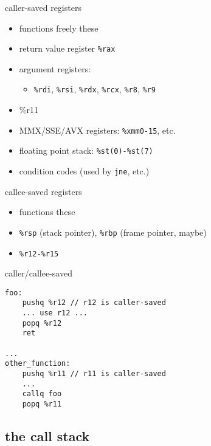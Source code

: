 \begin{frame}{caller-saved registers}
    \begin{itemize}
        \item functions  freely  these
        \vspace{.5cm}
        \item return value register {\tt \%rax}
        \item argument registers: \\
            \begin{itemize}
            \item {\tt \%rdi}, {\tt \%rsi}, {\tt \%rdx}, 
              {\tt \%rcx}, {\tt \%r8}, {\tt \%r9}
              \end{itemize}
        \item \%r11
        \item MMX/SSE/AVX registers: {\tt \%xmm0-15}, etc.
        \item floating point stack: {\tt \%st(0)-\%st(7)}
        \item condition codes (used by {\tt jne}, etc.)
    \end{itemize}
\end{frame}

\begin{frame}[fragile,label=calleeSaved]{callee-saved registers}
    \begin{itemize}
    \item functions  these
    \vspace{.5cm}
    \item {\tt \%rsp} (stack pointer), {\tt \%rbp} (frame pointer, maybe)
    \item {\tt \%r12-\%r15}
    \end{itemize}
\end{frame}

\begin{frame}[fragile,label=callerCallee]{caller/callee-saved}
\lstset{style=small}
\begin{lstlisting}
foo:
    pushq %r12 // r12 is caller-saved
    ... use r12 ...
    popq %r12
    ret

...
other_function:
    pushq %r11 // r11 is caller-saved
    ...
    callq foo
    popq %r11
\end{lstlisting}
\end{frame}


\subsection{the call stack}

